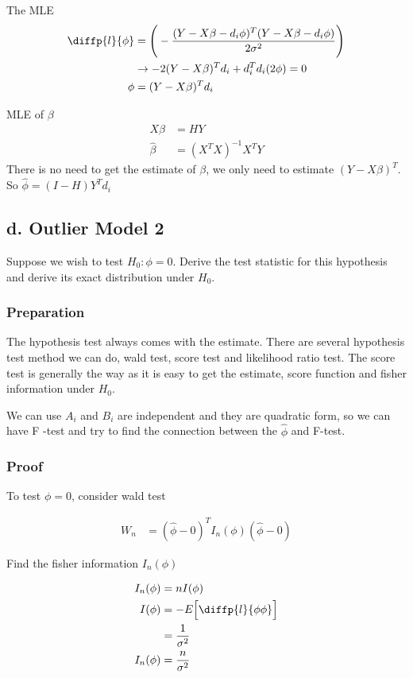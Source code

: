The MLE 
\begin{align*}
	\diffp{l}{\phi} & =\Bigg( -\frac{(Y- X\beta -d_i \phi)^T (Y- X\beta -d_i \phi)}{2 \sigma^2}  \Bigg) \\
	&\rightarrow -2(Y-X\beta)^T d_i + d_i^T d_i (2 \phi) = 0 \\
	\phi &= (Y-X\beta)^T d_i
\end{align*}

MLE of $\beta$ 
\begin{align*}
	X\beta & = HY \\
	\hat{\beta} &= (X^TX)^{-1} X^T Y
\end{align*}
There is no need to get the estimate of $\beta$, we only need to estimate  $(Y-X\beta)^T$. 
So $\hat{\phi} = (I-H)Y^T d_i$

\subsection{d. Outlier Model 2}
Suppose we wish to test $H_0 : \phi = 0$. Derive the test statistic for this hypothesis and derive its exact distribution under $H_0$.

\subsubsection{Preparation}

The hypothesis test always comes with the estimate. There are several hypothesis test method we can do, wald test, score test and likelihood ratio test. The score test is generally the way as it is easy to get the estimate, score function and fisher information under $H_0$.

We can use $A_i$ and $B_i$ are independent and they are quadratic form, so we can have F -test and try to find the connection between the $\hat{\phi}$ and F-test.



\subsubsection{Proof}

To test $\phi = 0$, consider wald test

\begin{align*}
	W_n & = (\hat{\phi} - 0)^T I_n (\phi) (\hat{\phi} - 0) 
\end{align*}

Find the fisher information $I_n(\phi)$ 

\begin{align*}
	I_n (\phi)& = n I(\phi) \\
	I(\phi) &= -E \Big[\diffp{l}{\phi \phi} \Big] \\
	&= \frac{1}{\sigma^2}\\
	I_n(\phi) & =\frac{n}{\sigma^2}
\end{align*}

